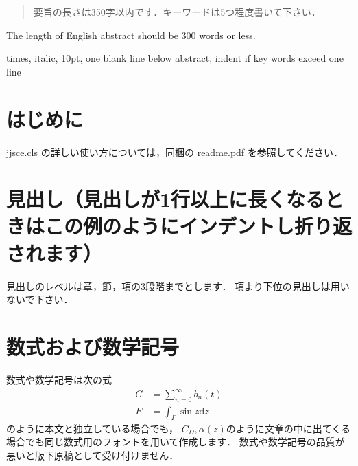 \documentclass{jjsce}
\begin{document}

\begin{abstract}
要旨の長さは350字以内です．キーワードは5つ程度書いて下さい．
\end{abstract}
\begin{Eabstract}
The length of English abstract should be 300 words or less.
\end{Eabstract}
\begin{keyword}
times, italic, 10pt, one blank line below abstract, indent if key words exceed one line
\end{keyword}
\maketitle

\section{はじめに}

jjsce.cls の詳しい使い方については，同梱の readme.pdf を参照してください．



\section{見出し（見出しが1行以上に長くなるときはこの例のようにインデントし折り返されます）}
見出しのレベルは章，節，項の3段階までとします．
項より下位の見出しは用いないで下さい．

\section{数式および数学記号}
数式や数学記号は次の式
\begin{align}
G&=\sum_{n=0}^\infty b_n(t)\\
F&=\int_{\Gamma}\sin z \mathrm{d}z
\end{align}
のように本文と独立している場合でも，
$C_D, \alpha(z)$のように文章の中に出てくる場合でも同じ数式用のフォントを用いて作成します．
数式や数学記号の品質が悪いと版下原稿として受け付けません．
\end{document}

